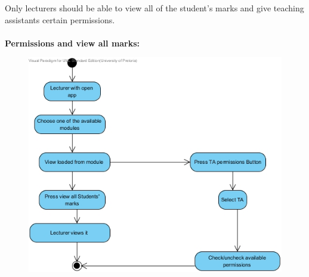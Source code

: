 \documentclass[12pt,a4paper]{article}
\begin{document}
\newpage
Only lecturers should be able to view all of the student's marks and give teaching assistants certain permissions.\\
\\
\textbf {Permissions and view all marks:}
\begin{figure}[h]
\begin{center}
\includegraphics[scale=0.7]{./AndroidActivityDiagrams/ActivityDiagram4}
\end{center}
\end{figure}
\end{document}
